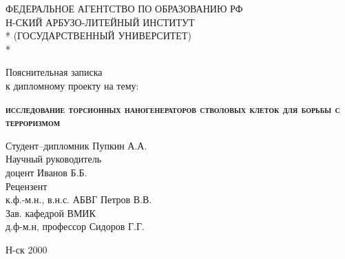 \begin{titlepage}
\newpage

\begin{center}
ФЕДЕРАЛЬНОЕ АГЕНТСТВО ПО ОБРАЗОВАНИЮ РФ \\
\vspace{1cm}
Н-СКИЙ АРБУЗО-ЛИТЕЙНЫЙ ИНСТИТУТ \\*
(ГОСУДАРСТВЕННЫЙ УНИВЕРСИТЕТ) \\*
\hrulefill
\end{center}
 

\vspace{8em}

\begin{center}
\Large Пояснительная записка \\ к дипломному проекту на тему:
\end{center}

\vspace{2.5em}
 
\begin{center}
\textsc{\textbf{исследование торсионных наногенераторов \linebreak стволовых клеток для борьбы с терроризмом}}
\end{center}

\vspace{6em}
 
\begin{flushleft}
Студент--дипломник \hrulefill Пупкин А.А. \\
\vspace{1.5em}
Научный руководитель \\
доцент \hrulefill Иванов Б.Б.\\
\vspace{1.5em}
Рецензент \\
к.ф.-м.н., в.н.с. АБВГ \hrulefill Петров В.В.\\
\vspace{1.5em}
Зав. кафедрой ВМИК \\
д.ф-м.н, профессор \hrulefill Сидоров Г.Г.
\end{flushleft}
 
\vspace{\fill}

\begin{center}
Н-ск 2000
\end{center}

\end{titlepage}
